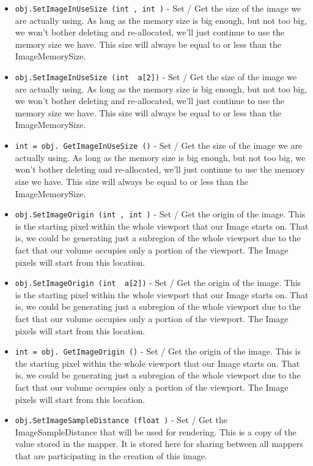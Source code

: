 \begin{itemize}
\item  \verb|obj.SetImageInUseSize (int , int )| -  Set / Get the size of the image we are actually using. As
 long as the memory size is big enough, but not too big,
 we won't bother deleting and re-allocated, we'll just 
 continue to use the memory size we have. This size will
 always be equal to or less than the ImageMemorySize.

\item  \verb|obj.SetImageInUseSize (int  a[2])| -  Set / Get the size of the image we are actually using. As
 long as the memory size is big enough, but not too big,
 we won't bother deleting and re-allocated, we'll just 
 continue to use the memory size we have. This size will
 always be equal to or less than the ImageMemorySize.

\item  \verb|int = obj. GetImageInUseSize ()| -  Set / Get the size of the image we are actually using. As
 long as the memory size is big enough, but not too big,
 we won't bother deleting and re-allocated, we'll just 
 continue to use the memory size we have. This size will
 always be equal to or less than the ImageMemorySize.

\item  \verb|obj.SetImageOrigin (int , int )| -  Set / Get the origin of the image. This is the starting 
 pixel within the whole viewport that our Image starts on.
 That is, we could be generating just a subregion of the
 whole viewport due to the fact that our volume occupies 
 only a portion of the viewport. The Image pixels will
 start from this location.

\item  \verb|obj.SetImageOrigin (int  a[2])| -  Set / Get the origin of the image. This is the starting 
 pixel within the whole viewport that our Image starts on.
 That is, we could be generating just a subregion of the
 whole viewport due to the fact that our volume occupies 
 only a portion of the viewport. The Image pixels will
 start from this location.

\item  \verb|int = obj. GetImageOrigin ()| -  Set / Get the origin of the image. This is the starting 
 pixel within the whole viewport that our Image starts on.
 That is, we could be generating just a subregion of the
 whole viewport due to the fact that our volume occupies 
 only a portion of the viewport. The Image pixels will
 start from this location.

\item  \verb|obj.SetImageSampleDistance (float )| -  Set / Get the ImageSampleDistance that will be used for 
 rendering. This is a copy of the value stored in the
 mapper. It is stored here for sharing between all mappers
 that are participating in the creation of this image.


\end{itemize}
